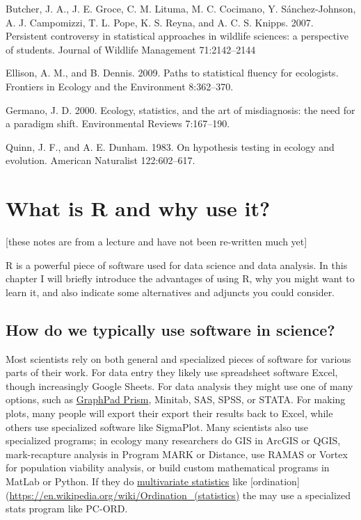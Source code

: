 \documentclass[]{book}
\theoremstyle{definition}
\theoremstyle{definition}
\theoremstyle{definition}
\theoremstyle{remark}
\begin{document}
Butcher, J. A., J. E. Groce, C. M. Lituma, M. C. Cocimano, Y.
Sánchez‐Johnson, A. J. Campomizzi, T. L. Pope, K. S. Reyna, and A. C. S.
Knipps. 2007. Persistent controversy in statistical approaches in
wildlife sciences: a perspective of students. Journal of Wildlife
Management 71:2142--2144

Ellison, A. M., and B. Dennis. 2009. Paths to statistical fluency for
ecologists. Frontiers in Ecology and the Environment 8:362--370.

Germano, J. D. 2000. Ecology, statistics, and the art of misdiagnosis:
the need for a paradigm shift. Environmental Reviews 7:167--190.

Quinn, J. F., and A. E. Dunham. 1983. On hypothesis testing in ecology
and evolution. American Naturalist 122:602--617.

\chapter{What is R and why use it?}\label{what-is-r-and-why-use-it}

{[}these notes are from a lecture and have not been re-written much
yet{]}

R is a powerful piece of software used for data science and data
analysis. In this chapter I will briefly introduce the advantages of
using R, why you might want to learn it, and also indicate some
alternatives and adjuncts you could consider.

\section{How do we typically use software in
science?}\label{how-do-we-typically-use-software-in-science}

Most scientists rely on both general and specialized pieces of software
for various parts of their work. For data entry they likely use
spreadsheet software Excel, though increasingly Google Sheets. For data
analysis they might use one of many options, such as
\href{https://www.graphpad.com/}{GraphPad Prism}, Minitab, SAS, SPSS, or
STATA. For making plots, many people will export their export their
results back to Excel, while others use specialized software like
SigmaPlot. Many scientists also use specialized programs; in ecology
many researchers do GIS in ArcGIS or QGIS, mark-recapture analysis in
Program MARK or Distance, use RAMAS or Vortex for population viability
analysis, or build custom mathematical programs in MatLab or Python. If
they do
\href{https://en.wikipedia.org/wiki/Multivariate_statistics}{multivariate
statistics} like
{[}ordination{]}(\url{https://en.wikipedia.org/wiki/Ordination_(statistics)}
the may use a specialized stats program like PC-ORD.
\end{document}
